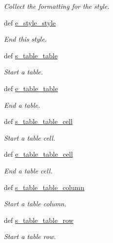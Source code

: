 \begin{DoxyCompactItemize}
\begin{DoxyCompactList}\small\item\em Collect the formatting for the style. \end{DoxyCompactList}\item 
def \hyperlink{classodf_1_1odf2xhtml_1_1ODF2XHTML_a5e5bf87a3ece09dc2d6859b538c9b9c0}{e\+\_\+style\+\_\+style}
\begin{DoxyCompactList}\small\item\em End this style. \end{DoxyCompactList}\item 
def \hyperlink{classodf_1_1odf2xhtml_1_1ODF2XHTML_a4a494589ec58282c53aa90771ef79675}{s\+\_\+table\+\_\+table}
\begin{DoxyCompactList}\small\item\em Start a table. \end{DoxyCompactList}\item 
def \hyperlink{classodf_1_1odf2xhtml_1_1ODF2XHTML_a15f7208b86e2a914835c58900195053d}{e\+\_\+table\+\_\+table}
\begin{DoxyCompactList}\small\item\em End a table. \end{DoxyCompactList}\item 
def \hyperlink{classodf_1_1odf2xhtml_1_1ODF2XHTML_a70570542694dd8d18132eb5bf0d6314f}{s\+\_\+table\+\_\+table\+\_\+cell}
\begin{DoxyCompactList}\small\item\em Start a table cell. \end{DoxyCompactList}\item 
def \hyperlink{classodf_1_1odf2xhtml_1_1ODF2XHTML_abe26e525a81964e1ca9851ec5dd4ff47}{e\+\_\+table\+\_\+table\+\_\+cell}
\begin{DoxyCompactList}\small\item\em End a table cell. \end{DoxyCompactList}\item 
def \hyperlink{classodf_1_1odf2xhtml_1_1ODF2XHTML_ab2998621813e4ad0f72e9ea8236a8174}{s\+\_\+table\+\_\+table\+\_\+column}
\begin{DoxyCompactList}\small\item\em Start a table column. \end{DoxyCompactList}\item 
def \hyperlink{classodf_1_1odf2xhtml_1_1ODF2XHTML_a003410d40c42ebe8b839c7ce44040784}{s\+\_\+table\+\_\+table\+\_\+row}
\begin{DoxyCompactList}\small\item\em Start a table row. \end{DoxyCompactList}\item 

\end{DoxyCompactItemize}
